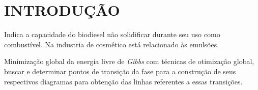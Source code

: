 
\chapter{INTRODUÇÃO}
\label{chap:introducao}

Indica a capacidade do biodiesel não solidificar durante seu uso como combustível. Na industria de cosmético está relacionado às emulsões. \cite{Leggieri2018a}

Minimização global da energia livre de \textit{Gibbs} com técnicas de otimização global, buscar e determinar pontos de transição da fase para a construção de seus respectivos diagramas para obtenção das linhas referentes a essas transições. \cite{Muller2019}

